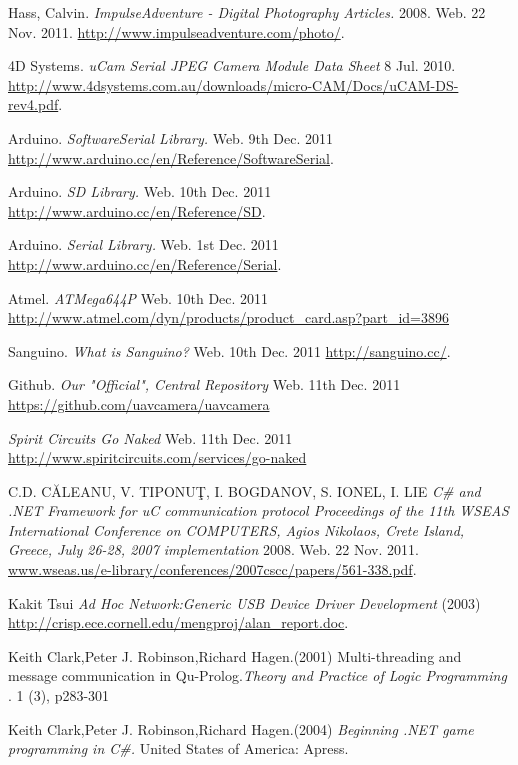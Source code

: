 \begin{thebibliography}{9}
	 Hass, Calvin. \emph{ImpulseAdventure - Digital Photography Articles.} 2008. Web. 22 Nov. 2011. \url{http://www.impulseadventure.com/photo/}.
	
	 4D Systems. \emph{uCam Serial JPEG Camera Module Data Sheet} 8 Jul. 2010. \url{http://www.4dsystems.com.au/downloads/micro-CAM/Docs/uCAM-DS-rev4.pdf}.

	 Arduino. \emph{SoftwareSerial Library.} Web. 9th Dec. 2011 \url{http://www.arduino.cc/en/Reference/SoftwareSerial}.

	 Arduino. \emph{SD Library.} Web. 10th Dec. 2011 \url{http://www.arduino.cc/en/Reference/SD}.
	
	 Arduino. \emph{Serial Library.} Web. 1st Dec. 2011 \url{http://www.arduino.cc/en/Reference/Serial}.

	 Atmel. \emph{ATMega644P} Web. 10th Dec. 2011 \url{http://www.atmel.com/dyn/products/product_card.asp?part_id=3896}

	 Sanguino. \emph{What is Sanguino?} Web. 10th Dec. 2011 \url{http://sanguino.cc/}.

	 Github. \emph{Our "Official", Central Repository} Web. 11th Dec. 2011 \url{https://github.com/uavcamera/uavcamera}

	 \emph{Spirit Circuits Go Naked} Web. 11th Dec. 2011 \url{http://www.spiritcircuits.com/services/go-naked}
	
	 C.D. CĂLEANU, V. TIPONUŢ, I. BOGDANOV, S. IONEL, I. LIE \emph{C\# and .NET Framework for uC communication protocol Proceedings of the 11th WSEAS International Conference on COMPUTERS, Agios Nikolaos, Crete Island, Greece, July 26-28, 2007
implementation} 2008. Web. 22 Nov. 2011.
\url{www.wseas.us/e-library/conferences/2007cscc/papers/561-338.pdf}.

	 Kakit Tsui \emph{Ad Hoc Network:Generic USB Device Driver Development} (2003)
\url{http://crisp.ece.cornell.edu/mengproj/alan_report.doc}.

	 Keith Clark,Peter J. Robinson,Richard Hagen.(2001) Multi-threading and message communication in Qu-Prolog.\textit{Theory and Practice of Logic Programming} . 1 (3), p283-301 
	
	 Keith Clark,Peter J. Robinson,Richard Hagen.(2004) \textit{Beginning .NET game programming in C\#.} United States of America: Apress. 


\end{thebibliography}
